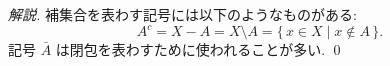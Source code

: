 \documentclass[12pt,twoside]{jarticle}
\begin{document}
\begin{proof}[解説]
補集合を表わす記号には以下のようなものがある:
\[
    A^c = X - A = X \setminus A = \{\,x \in X \mid x \notin A\,\}.
\]
記号 $\bar A$ は閉包を表わすために使われることが多い. 
\qed
\end{proof}


%
%
%
%
%



%

\end{document}
